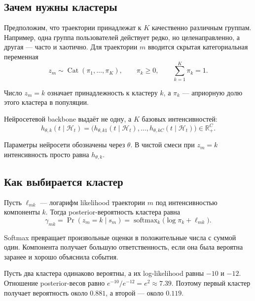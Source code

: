\documentclass[12pt,a4paper]{article}
\DeclareMathOperator{\softmax}{softmax}
\DeclareMathOperator{\Cat}{Cat}
\newcommand{\R}{\mathbb{R}}
\newcommand{\History}{\mathcal{H}}
\newenvironment{examplebox}{\par\medskip\noindent{\color{orange}\bfseries Численный пример. }\ignorespaces}{\par\medskip}
\begin{document}
\subsection{Зачем нужны кластеры}

Предположим, что траектории принадлежат к \(K\) качественно различным группам. Например, одна группа пользователей действует редко, но целенаправленно, а другая --- часто и хаотично. Для траектории \(m\) вводится скрытая категориальная переменная
\begin{equation}
z_m\sim\Cat(\pi_1,\ldots,\pi_K),\qquad \pi_k\geq0,\qquad \sum_{k=1}^{K}\pi_k=1.
\end{equation}

Число \(z_m=k\) означает принадлежность к кластеру \(k\), а \(\pi_k\) --- априорную долю этого кластера в популяции.

Нейросетевой backbone выдаёт не одну, а \(K\) базовых интенсивностей:
\begin{equation}
h_{\theta,k}(t\mid\History_t)=\bigl(h_{\theta,k1}(t\mid\History_t),\ldots,h_{\theta,kC}(t\mid\History_t)\bigr)\in\R_+^C.
\end{equation}

Параметры нейросети обозначены через \(\theta\). В чистой смеси при \(z_m=k\) интенсивность просто равна \(h_{\theta,k}\).

\subsection{Как выбирается кластер}

Пусть \(\ell_{mk}\) --- логарифм likelihood траектории \(m\) под интенсивностью компоненты \(k\). Тогда posterior-вероятность кластера равна
\begin{equation}
\gamma_{mk}=\Pr(z_m=k\mid s_m)=\softmax_k\bigl(\log\pi_k+\ell_{mk}\bigr).
\end{equation}

Softmax превращает произвольные оценки в положительные числа с суммой один. Компонента получает большую ответственность, если она была вероятна заранее и хорошо объяснила события.

\begin{examplebox}
Пусть два кластера одинаково вероятны, а их log-likelihood равны \(-10\) и \(-12\). Отношение posterior-весов равно \(e^{-10}/e^{-12}=e^2\approx7.39\). Поэтому первый кластер получает вероятность около \(0.881\), а второй --- около \(0.119\).
\end{examplebox}
\end{document}
